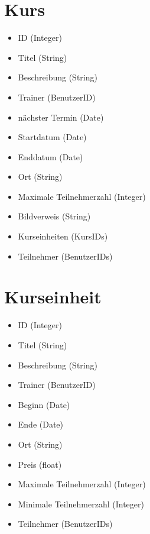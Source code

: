 \documentclass[a4paper]{scrreprt}
\newcounter{Lc}
\newcounter{Hc}
\newcommand{\stepHc}{\stepcounter{Hc}\setcounter{Lc}{0}}
\begin{document}
	    
\stepHc		    	
	\section{Kurs}
	   \Func {} 
	   \begin{itemize}
	   	\item ID (Integer)
	   	\item Titel (String)
	   	\item Beschreibung (String)
	   	\item Trainer (BenutzerID)
	   	\item nächster Termin (Date)
	   	\item Startdatum (Date)
	   	\item Enddatum (Date)
	   	\item Ort (String)
	   	\item Maximale Teilnehmerzahl (Integer)
	   	\item Bildverweis (String)
	   	\item Kurseinheiten (KursIDs)
	   	\item Teilnehmer (BenutzerIDs)
	   \end{itemize}
\stepHc		    
	\section{Kurseinheit}
	 \Func {} 
	 \begin{itemize}
	 	\item ID (Integer)
	 	\item Titel (String)
	 	\item Beschreibung (String)
	 	\item Trainer (BenutzerID)
	 	\item Beginn (Date)
	 	\item Ende (Date)
	 	\item Ort (String)
	 	\item Preis (float)
	 	\item Maximale Teilnehmerzahl (Integer)
	 	\item Minimale Teilnehmerzahl (Integer)
	 	\item Teilnehmer (BenutzerIDs)
	 \end{itemize}   
    
    
\stepHc	   		
\end{document}
